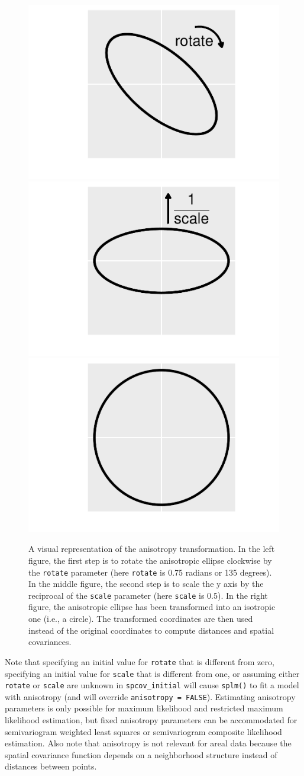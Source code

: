 \documentclass[10pt,letterpaper]{article}
\begin{document}
\begin{figure}
\includegraphics[width=0.33\linewidth]{preprint_old_files/figure-latex/anisotropy_fit-1} \includegraphics[width=0.33\linewidth]{preprint_old_files/figure-latex/anisotropy_fit-2} \includegraphics[width=0.33\linewidth]{preprint_old_files/figure-latex/anisotropy_fit-3} \caption{A visual representation of the anisotropy transformation. In the left figure, the first step is to rotate the anisotropic ellipse clockwise by the \texttt{rotate} parameter (here \texttt{rotate} is 0.75 radians or 135 degrees). In the middle figure, the second step is to scale the y axis by the reciprocal of the \texttt{scale} parameter (here \texttt{scale} is 0.5). In the right figure, the anisotropic ellipse has been transformed into an isotropic one (i.e., a circle). The transformed coordinates are then used instead of the original coordinates to compute distances and spatial covariances.}\label{fig:anisotropy_fit}
\end{figure}

Note that specifying an initial value for \texttt{rotate} that is
different from zero, specifying an initial value for \texttt{scale} that
is different from one, or assuming either \texttt{rotate} or
\texttt{scale} are unknown in \texttt{spcov\_initial} will cause
\texttt{splm()} to fit a model with anisotropy (and will override
\texttt{anisotropy\ =\ FALSE}). Estimating anisotropy parameters is only
possible for maximum likelihood and restricted maximum likelihood
estimation, but fixed anisotropy parameters can be accommodated for
semivariogram weighted least squares or semivariogram composite
likelihood estimation. Also note that anisotropy is not relevant for
areal data because the spatial covariance function depends on a
neighborhood structure instead of distances between points.
\end{document}
